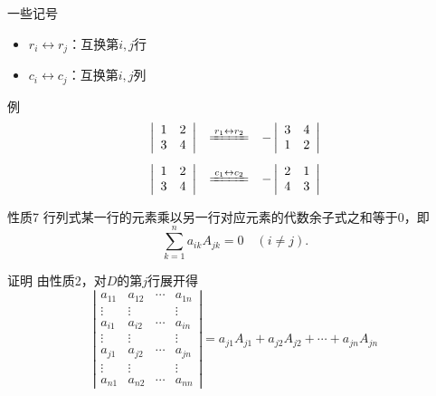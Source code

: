 \begin{frame}
  \begin{block}{一些记号}
    \begin{itemize}
    \item $r_i \leftrightarrow r_j $：互换第$i,j$行 \\[0.1in]
    \item $c_i \leftrightarrow c_j $：互换第$i,j$列
    \end{itemize}
  \end{block}

  \begin{exampleblock}{例}
    $$
    \begin{array}{rcl}
      \left|
      \begin{array}{ccc}
        1 & 2  \\
        3 & 4  \\
      \end{array}
      \right|
      &\xlongequal[]{r_1\leftrightarrow r_2}&
      -\left|
      \begin{array}{ccc}
        3 & 4 \\
        1 & 2 
      \end{array}
      \right|    \\[0.2in]
      \left|
      \begin{array}{ccc}
        1 & 2  \\
        3 & 4  
      \end{array}
      \right|
      &\xlongequal[]{c_1\leftrightarrow c_2}&
      -\left|
      \begin{array}{ccc}
        2 & 1  \\
        4 & 3  
      \end{array}
      \right|    
    \end{array}
    $$

  \end{exampleblock}
\end{frame}

\begin{frame}
  \begin{block}{性质7}
    行列式某一行的元素乘以另一行对应元素的代数余子式之和等于$0$，即
    $$
    \sum_{k=1}^n a_{ik} A_{jk}  = 0 \quad (i\ne j).
    $$
  \end{block}
  \pause
  \begin{block}{证明}
    由性质2，对$D$的第$j$行展开得
    $$
    \left|
    \begin{array}{cccc}
      a_{11} & a_{12} & \cdots & a_{1n}\\
      \vdots & \vdots &  & \vdots \\
      a_{i1} & a_{i2} & \cdots & a_{in}\\
      \vdots & \vdots &  & \vdots \\
      a_{j1} & a_{j2} & \cdots & a_{jn}\\
      \vdots & \vdots &  & \vdots \\
      a_{n1} & a_{n2} & \cdots & a_{nn}
    \end{array}
    \right|   =  a_{j1} A_{j1} + a_{j2} A_{j2} + \cdots + a_{jn} A_{jn}
    $$

  \end{block}
\end{frame}

